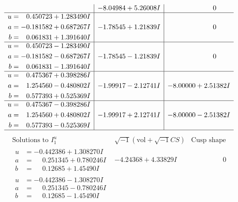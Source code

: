 \documentclass[1p]{elsarticle_modified}
\theoremstyle{definition}
\newcommand{\I}{\sqrt{-1}}
\begin{document}
$$\begin{array}{c|c|c}
 & -8.04984 + 5.26008 I & \phantom{-0.000000 } 0 \\ \hline\begin{aligned}
u &= \phantom{-}0.450723 + 1.283490 I \\
a &= -0.181582 + 0.687267 I \\
b &= \phantom{-}0.061831 + 1.391640 I\end{aligned}
 & -1.78545 + 1.21839 I & \phantom{-0.000000 } 0 \\ \hline\begin{aligned}
u &= \phantom{-}0.450723 - 1.283490 I \\
a &= -0.181582 - 0.687267 I \\
b &= \phantom{-}0.061831 - 1.391640 I\end{aligned}
 & -1.78545 - 1.21839 I & \phantom{-0.000000 } 0 \\ \hline\begin{aligned}
u &= \phantom{-}0.475367 + 0.398286 I \\
a &= \phantom{-}1.254560 - 0.480802 I \\
b &= \phantom{-}0.577393 + 0.525369 I\end{aligned}
 & -1.99917 - 2.12741 I & -8.00000 + 2.51382 I \\ \hline\begin{aligned}
u &= \phantom{-}0.475367 - 0.398286 I \\
a &= \phantom{-}1.254560 + 0.480802 I \\
b &= \phantom{-}0.577393 - 0.525369 I\end{aligned}
 & -1.99917 + 2.12741 I & -8.00000 - 2.51382 I\\
 \hline 
 \end{array}$$\newpage$$\begin{array}{c|c|c}  
\text{Solutions to }I^u_{1}& \I (\text{vol} + \sqrt{-1}CS) & \text{Cusp shape}\\
 \hline 
\begin{aligned}
u &= -0.442386 + 1.308270 I \\
a &= \phantom{-}0.251345 + 0.780246 I \\
b &= \phantom{-}0.12685 + 1.45490 I\end{aligned}
 & -4.24368 + 4.33829 I & \phantom{-0.000000 } 0 \\ \hline\begin{aligned}
u &= -0.442386 - 1.308270 I \\
a &= \phantom{-}0.251345 - 0.780246 I \\
b &= \phantom{-}0.12685 - 1.45490 I\end{aligned}

\end{array}$$
\end{document}
